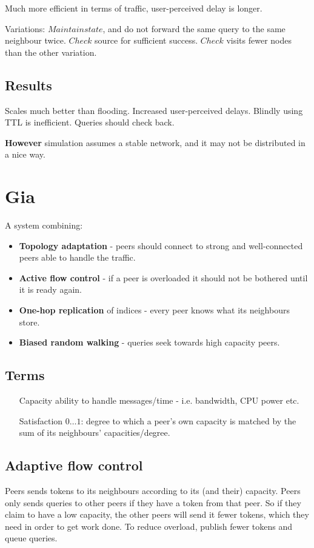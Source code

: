 	Much more efficient in terms of traffic, user-perceived delay is longer.
	
	Variations: $Maintain state$, and do not forward the same query to the same neighbour twice. $Check$ source for sufficient success. $Check$ visits fewer nodes than the other variation.
	
	\subsection{Results}
	Scales much better than flooding. Increased user-perceived delays. Blindly using \gls{TTL} is inefficient. Queries should check back.
	
	\textbf{However} simulation assumes a stable network, and it may not be distributed in a nice way.
	
	\section{Gia}
	A system combining:
	\begin{itemize}
		\item \textbf{Topology adaptation} - peers should connect to strong and well-connected peers able to handle the traffic.
		\item \textbf{Active flow control} - if a peer is overloaded it should not be bothered until it is ready again.
		\item \textbf{One-hop replication} of indices - every peer knows what its neighbours store.
		\item \textbf{Biased random walking} - queries seek towards high capacity peers.
	\end{itemize}
	
	\subsection{Terms}
	\begin{itemize}
		\item[Capacity] ability to handle messages/time - i.e. bandwidth, CPU power etc.
		\item[Satisfaction] $0\dots1$: degree to which a peer's own capacity is matched by the sum of its neighbours' capacities/degree.
	\end{itemize}
	
	
	\subsection{Adaptive flow control}
	Peers sends tokens to its neighbours according to its (and their) capacity. Peers only sends queries to other peers if they have a token from that peer. So if they claim to have a low capacity, the other peers will send it fewer tokens, which they need in order to get work done.
	To reduce overload, publish fewer tokens and queue queries.
	
